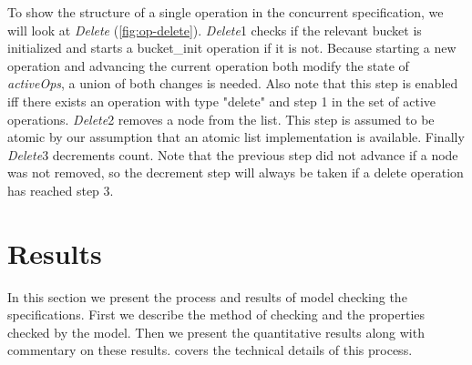 \documentclass{uit-thesis}
\begin{document}
To show the structure of a single operation in the concurrent specification, we will look at \textit{Delete} (\autoref{fig:op-delete}). \textit{Delete}1 checks if the relevant bucket is initialized and starts a bucket\_init operation if it is not. Because starting a new operation and advancing the current operation both modify the state of \textit{activeOps}, a union of both changes is needed. Also note that this step is enabled iff there exists an operation with type "delete" and step 1 in the set of active operations. \textit{Delete}2 removes a node from the list. This step is assumed to be atomic by our assumption that an atomic list implementation is available. Finally \textit{Delete}3 decrements count. Note that the previous step did not advance if a node was not removed, so the decrement step will always be taken if a delete operation has reached step 3.

\chapter{Results}\label{ch:results}
In this section we present the process and results of model checking the specifications. First we describe the method of checking and the properties checked by the model. Then we present the quantitative results along with commentary on these results.  covers the technical details of this process.
\end{document}
